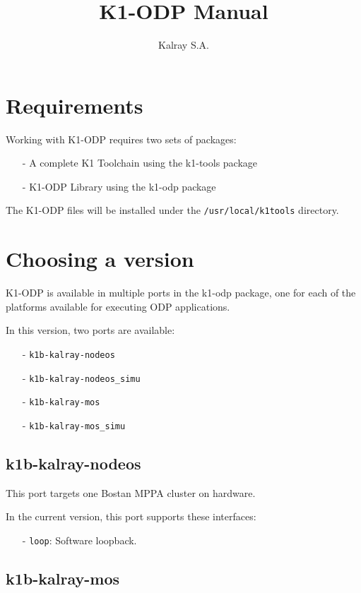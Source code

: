 \documentclass{trkalray}
\author{%
Kalray S.A.\autref{1}
}
\institute{%
\autlabel{1} \email{support@kalray.eu},
Kalray S.A.
}
\title{K1-ODP Manual}
\begin{document}
\maketitle

\tableofcontents

\newpage
\section{Requirements}

Working with K1-ODP requires two sets of packages:
\begin{itemize}
\item[-]{A complete K1 Toolchain using the k1-tools package}
\item[-]{K1-ODP Library using the k1-odp package}
\end{itemize}

The K1-ODP files will be installed under the
\texttt{/usr/local/k1tools} directory.

\section{Choosing a version}
K1-ODP is available in multiple ports in the k1-odp package, one for
each of the platforms available for executing ODP applications.

In this version, two ports are available:
\begin{itemize}
\item[-]{\texttt{k1b-kalray-nodeos}}
\item[-]{\texttt{k1b-kalray-nodeos\_simu}}
\item[-]{\texttt{k1b-kalray-mos}}
\item[-]{\texttt{k1b-kalray-mos\_simu}}
\end{itemize}

\subsection{k1b-kalray-nodeos}

This port targets one Bostan MPPA cluster on hardware.

In the current version, this port supports these interfaces:
\begin{itemize}
\item[-]{\texttt{loop}: Software loopback.}
\end{itemize}

\subsection{k1b-kalray-mos}
\end{document}
